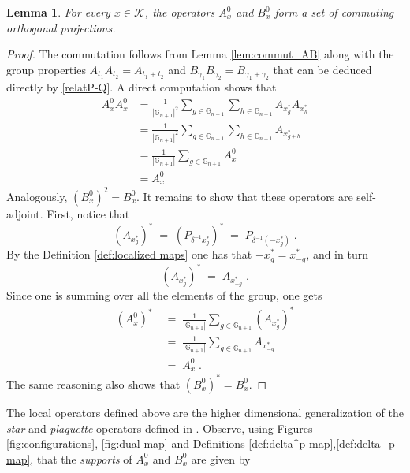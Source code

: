 \documentclass[a4paper,12pt,twoside,reqno]{amsart}
\theoremstyle{plain}
\newtheorem{lemma}[teo]{Lemma}
\theoremstyle{definition}
\theoremstyle{remark}
\numberwithin{equation}{section}
\numberwithin{figure}{section}
\numberwithin{table}{section}
\newcommand{\pa}[1]{\left( #1 \right)}
\newcommand{\f}[1]{\mathcal{#1}}
\newcommand{\n}[1]{\mathbb{#1}}
\newcommand{\ab}[1]{\left| #1 \right|}
\begin{document}
	
	
	
	
	
	
	
	
	\begin{lemma}\label{lemma:projections}
		For every $x\in \f{K}$, the operators $A_x^0$ and $B_x^0$ form a set of commuting orthogonal projections.
	\end{lemma}
	
	
	
	
	
	
	
	
	
	\begin{proof}
		The commutation follows from Lemma \ref{lem:commut_AB} along with the group properties 
		$A_{t_1}A_{t_2}=A_{t_1+t_2}$ and $B_{\gamma_1}B_{\gamma_2}=B_{\gamma_1+\gamma_2}$ that can be deduced directly by \eqref{relatP-Q}.
		A direct computation shows that
		\begin{align*}
			A_x^0A_x^0&=\frac{1}{\ab{\n{G}_{n+1}}^2}\sum_{g\in \n{G}_{n+1}}\sum_{h\in \n{G}_{n+1}}A_{x^*_g}A_{x^*_h}\\
			&=\frac{1}{\ab{\n{G}_{n+1}}^2}\sum_{g\in \n{G}_{n+1}}\sum_{h\in \n{G}_{n+1}}A_{x^*_{g+h}}\\
			&=\frac{1}{\ab{\n{G}_{n+1}}}\sum_{g\in\n{G}_{n+1}}A_x^0\\
			&=A_x^0
		\end{align*}
		Analogously, $\pa{B_x^0}^2=B_x^0$. It remains to show that these operators
		are self-adjoint. First, notice that $$(A_{x^*_g})^*\;=\;(P_{\delta^{-1}x^*_g})^*\;=\;P_{\delta^{-1}(-x^*_g)}\;.$$
		By the Definition \ref{def:localized maps} one has that $-x^*_g=x^*_{-g}$, and in turn
		$$(A_{x^*_g})^*\;=\;A_{x^*_{-g}}\;.$$ Since one is summing over all the elements of the group, one gets
		\begin{align*} 
			\pa{A_x^0}^*\;&=\;\frac{1}{\ab{\n{G}_{n+1}}}\sum_{g\in \n{G}_{n+1}}\pa{A_{x^*_{g}}}^*\\
			&=\;\frac{1}{\ab{\n{G}_{n+1}}}\sum_{g\in \n{G}_{n+1}}A_{x^*_{-g}}\\
			&=\;A_x^0\;.
		\end{align*}
		The same reasoning also shows that $\pa{B_x^0}^*=B_x^0$.
	\end{proof}
	
	
	
	\medskip
	
	
	
	
	
	The local operators defined above are the higher dimensional generalization of the \emph{star} and \emph{plaquette} operators defined in \cite{Kitaev_2003}. Observe, using Figures \ref{fig:configurations}, \ref{fig:dual map} and Definitions \ref{def:delta^p map},\ref{def:delta_p map}, that the \emph{supports} of \( A_x^0 \) and \( B_x^0 \) are given by
	
\end{document}

